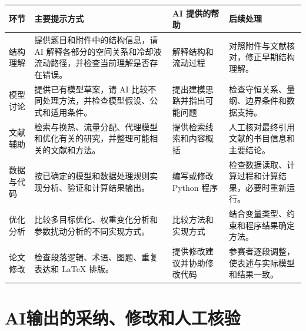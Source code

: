 \documentclass[UTF8,a4paper,11pt]{ctexart}
\begin{document}
\begin{table}[htbp]
\centering
\small
\begin{tabularx}{\textwidth}{L{1.65cm} L{5.05cm} L{3.15cm} Y}
\toprule
\textbf{环节} & \textbf{主要提示方式} & \textbf{AI 提供的帮助} & \textbf{后续处理} \\
\midrule
结构理解 & 提供题目和附件中的结构信息，请 AI 解释各部分的空间关系和冷却液流动路径，并检查当前理解是否存在错误。 & 解释结构和流动过程 & 对照附件与文献核对，修正早期结构理解。 \\
模型讨论 & 提供已有模型草案，请 AI 比较不同处理方法，并检查模型假设、公式和适用条件。 & 提出建模思路并指出可能问题 & 检查守恒关系、量纲、边界条件和数据支持。 \\
文献辅助 & 检索与换热、流量分配、代理模型和优化有关的研究，并整理可能相关的文献和方法。 & 提供检索线索和内容概括 & 人工核对最终引用文献的书目信息和主要结论。 \\
数据与代码 & 按已确定的模型和数据处理规则实现分析、验证和计算结果输出。 & 编写或修改 Python 程序 & 检查数据读取、计算过程和计算结果，必要时重新运行。 \\
优化分析 & 比较多目标优化、权重变化分析和参数扰动分析的不同实现方式。 & 比较方法和实现方式 & 结合变量类型、约束和程序结果确定方法。 \\
论文修改 & 检查段落逻辑、术语、图题、重复表达和 \LaTeX{} 排版。 & 提供修改建议并协助修改代码 & 参赛者逐段调整，使表述与实际模型和结果一致。 \\
\bottomrule
\end{tabularx}
\end{table}

\clearpage
\section{AI输出的采纳、修改和人工核验}
\end{document}
